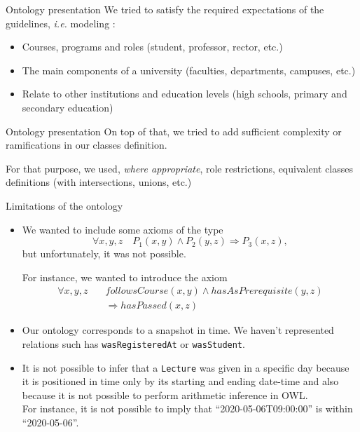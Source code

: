 \documentclass[12pt]{beamer}
\begin{document}
\begin{frame}{Ontology presentation}
    We tried to satisfy the \alert{required} expectations of the guidelines, \emph{i.e.} modeling :
    \begin{itemize}
        \item Courses, programs and roles (student, professor, rector, etc.)
        \item The main components of a university (faculties, departments, campuses, etc.)
        \item Relate to other institutions and education levels (high schools, primary and secondary education) %
    \end{itemize}
\end{frame}

\begin{frame}{Ontology presentation}
    On top of that, we tried to add sufficient \alert{complexity} or ramifications in our classes definition.
    
    For that purpose, we used, \emph{where appropriate}, role restrictions, equivalent classes definitions (with intersections, unions, etc.)
\end{frame}

\begin{frame}[allowframebreaks]{Limitations of the ontology}
    \begin{itemize}
        \item We wanted to include some axioms of the type $$\forall x, y, z \quad P_1(x, y) \wedge P_2(y, z) \Rightarrow P_3(x, z), $$ but unfortunately, it was not possible.
        
        For instance, we wanted to introduce the axiom
        \begin{align*}
            \forall x, y, z \quad & followsCourse(x, y) \wedge hasAsPrerequisite(y, z) \\
            & \Rightarrow hasPassed(x, z)
        \end{align*}
    
        \item Our ontology corresponds to a snapshot in time. We haven't represented relations such has \texttt{wasRegisteredAt} or \texttt{wasStudent}.
        
        \item It is not possible to infer that a \texttt{Lecture} was given in a specific day because it is positioned in time only by its starting and ending date-time and also because it is not possible to perform \alert{arithmetic} inference in OWL. \\[0.5em]
                
        For instance, it is not possible to imply that \enquote{2020-05-06T09:00:00} is within \enquote{2020-05-06}.
    \end{itemize}
\end{frame}
\end{document}
